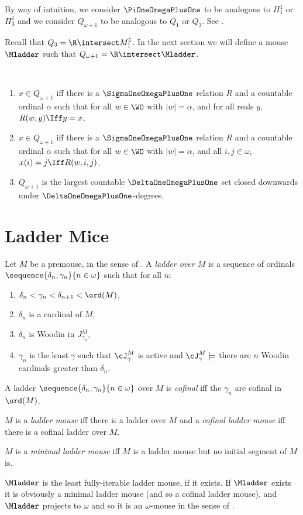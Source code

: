 \documentclass[oneside,12pt]{amsart}
\begin{document}
By way of intuition, we consider $\PiOneOmegaPlusOne$ to be analogous to
$\Pi^1_1$ or $\Pi^1_3$ and we consider $Q_{\omega+1}$ to be analogous to
$Q_1$ or $Q_3$. See \cite{Q_Theory}.

Recall that $Q_3 = \R \intersect M_1^{\sharp}$. In the next section we will
define a mouse $\Mladder$ such that $Q_{\omega+1} = \R\intersect\Mladder$.

\begin{remarks} \
\begin{enumerate}
\item $x\in Q_{\omega+1}$ iff there is a $\SigmaOneOmegaPlusOne$ relation $R$ and
a countable ordinal $\alpha$ such that for all $w\in\WO$ with $|w|=\alpha$,
and for all reals $y$, $R(w,y) \Iff y=x$.
\item $x\in Q_{\omega+1}$ iff there is a $\SigmaOneOmegaPlusOne$ relation $R$
and a countable ordinal $\alpha$ such
that for all $w\in\WO$ with $|w|=\alpha$, and all $i,j\in\omega$,
$x(i)=j \Iff R(w,i,j)$.
\item $Q_{\omega+1}$ is the largest countable
$\DeltaOneOmegaPlusOne$ set closed downwards under
$\DeltaOneOmegaPlusOne$-degrees.
\end{enumerate}
\end{remarks}


\section{Ladder Mice}
\label{section:laddermice}
\begin{definition}
Let $M$ be a premouse, in the sense of \cite{FSIT}. A \emph{ladder over $M$}
is a sequence of ordinals $\sequence{\delta_n,\gamma_n}{n\in\omega}$ such that
for all $n$:
\begin{enumerate}
\item $\delta_n < \gamma_n < \delta_{n+1} < \ord(M)$,
\item $\delta_n$ is a cardinal of $M$,
\item $\delta_n$ is Woodin in $J^M_{\gamma_n}$,
\item $\gamma_n$ is the least $\gamma$ such that $\cJ^M_{\gamma}$ is active and
$\cJ^M_{\gamma}\models$ there are $n$ Woodin cardinals greater than $\delta_n$.
\end{enumerate}

A ladder $\sequence{\delta_n,\gamma_n}{n\in\omega}$ over $M$ is \emph{cofinal}
iff the $\gamma_n$ are cofinal in $\ord(M)$.

$M$ is a \emph{ladder mouse} iff there is a ladder over $M$ and a
\emph{cofinal ladder mouse} iff there is a cofinal ladder over $M$.

$M$ is a \emph{minimal ladder mouse} iff $M$ is a ladder mouse but no initial
segment of $M$ is.

$\Mladder$ is the least fully-iterable ladder mouse, if it exists. If
$\Mladder$ exists it is obviously a minimal ladder mouse (and so a cofinal
ladder mouse), and $\Mladder$ projects to $\omega$ and so it is an $\omega$-mouse
in the sense of \cite{Proj_WO_In_Mod}.
\end{definition}
\end{document}
